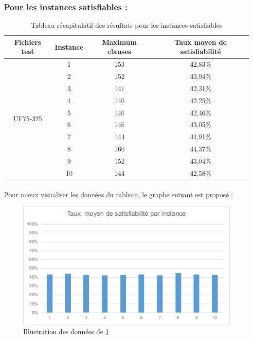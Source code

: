 \subsubsection{Pour les instances satisfiables :}
\begin{table}[H]
	\centering
	\label{table:Tab_BFS_Sat}
	\begin{tabular}{|c|c|c|c|}
		\hline
		Fichiers test              & Instance & Maximum clauses & Taux  moyen de satisfiabilité \\ \hline
		\multirow{10}{*}{UF75-325} & 1        & 153             & 42,83\%                       \\ \cline{2-4} 
		& 2        & 152             & 43,94\%                       \\ \cline{2-4} 
		& 3        & 147             & 42,31\%                       \\ \cline{2-4} 
		& 4        & 140             & 42,25\%                       \\ \cline{2-4} 
		& 5        & 146             & 42,46\%                       \\ \cline{2-4} 
		& 6        & 146             & 43,05\%                       \\ \cline{2-4} 
		& 7        & 144             & 41,91\%                       \\ \cline{2-4} 
		& 8        & 160             & 44,37\%                       \\ \cline{2-4} 
		& 9        & 152             & 43,04\%                       \\ \cline{2-4} 
		& 10       & 144             & 42,58\%                       \\ \hline
	\end{tabular}
	\caption{Tableau récapitulatif des résultats pour les instances satisfiables}
\end{table}
\newpage
\paragraph{}Pour mieux visualiser les données du tableau, le graphe suivant est proposé :\\

\begin{figure}[H]
	\includegraphics[width=\textwidth]{images/BFSUF75Graph.png}
	\caption{Illustration des données de \ref{table:Tab_BFS_Sat}}
\end{figure}
\newpage
